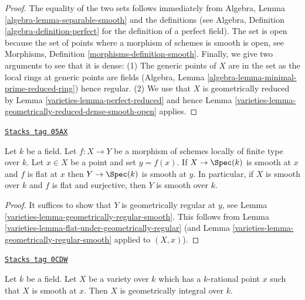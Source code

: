 \begin{proof}

The equality of the two sets follows immediately from
Algebra, Lemma \ref{algebra-lemma-separable-smooth} and the definitions
(see Algebra, Definition \ref{algebra-definition-perfect} for the definition
of a perfect field). The set is open because the set of points where
a morphism of schemes is smooth is open, see
Morphisms, Definition \ref{morphisms-definition-smooth}.
Finally, we give two arguments to see that it is dense:
(1) The generic points of $X$ are in the set as the local rings at
generic points are fields (Algebra, Lemma
\ref{algebra-lemma-minimal-prime-reduced-ring}) hence regular.
(2) We use that $X$ is geometrically reduced by
Lemma \ref{varieties-lemma-perfect-reduced} and hence
Lemma \ref{varieties-lemma-geometrically-reduced-dense-smooth-open} applies.
\end{proof}

\begin{lemma}
\label{varieties-lemma-flat-under-smooth}
\href{https://stacks.math.columbia.edu/tag/05AX}{\texttt{Stacks tag 05AX}}

Let $k$ be a field. Let $f : X \to Y$ be a morphism of schemes locally
of finite type over $k$. Let $x \in X$ be a point and set $y = f(x)$.
If $X \to \Spec(k)$ is smooth at $x$ and $f$ is flat at $x$
then $Y \to \Spec(k)$ is smooth at $y$. In particular, if $X$ is
smooth over $k$ and $f$ is flat and surjective, then $Y$ is smooth over $k$.
\end{lemma}

\begin{proof}

It suffices to show that $Y$ is geometrically regular at $y$, see
Lemma \ref{varieties-lemma-geometrically-regular-smooth}.
This follows from
Lemma \ref{varieties-lemma-flat-under-geometrically-regular}
(and
Lemma \ref{varieties-lemma-geometrically-regular-smooth}
applied to $(X, x)$).
\end{proof}

\begin{lemma}
\label{varieties-lemma-variety-with-smooth-rational-point}
\href{https://stacks.math.columbia.edu/tag/0CDW}{\texttt{Stacks tag 0CDW}}

Let $k$ be a field. Let $X$ be a variety over $k$ which has
a $k$-rational point $x$ such that $X$ is smooth at $x$.
Then $X$ is geometrically integral over $k$.
\end{lemma}

